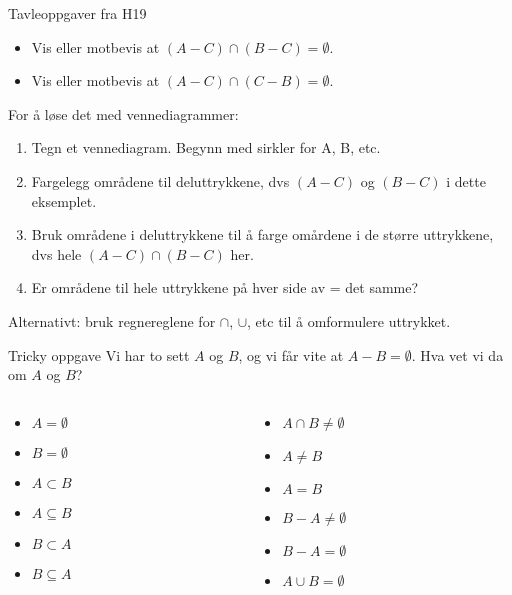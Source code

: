 \begin{frame}{Tavleoppgaver fra H19}
    \begin{itemize}
        \item Vis eller motbevis at $(A - C) \cap (B - C) = \emptyset.$
        \item Vis eller motbevis at $(A - C) \cap (C - B) = \emptyset.$
    \end{itemize}
    
    For å løse det med vennediagrammer:
    \begin{enumerate}
        \item Tegn et vennediagram. Begynn med sirkler for A, B, etc.
        \item Fargelegg områdene til deluttrykkene, dvs $(A - C)$ og $(B - C)$ i dette eksemplet.
        \item Bruk områdene i deluttrykkene til å farge omårdene i de større uttrykkene, dvs hele $(A - C) \cap (B - C)$ her.
        \item Er områdene til hele uttrykkene på hver side av = det samme?
    \end{enumerate}
    \pause
    Alternativt: bruk regnereglene for $\cap$, $\cup$, etc til å omformulere uttrykket.
\end{frame}

\begin{frame}{Tricky oppgave}
Vi har to sett $A$ og $B$, og vi får vite at $A - B = \emptyset$. Hva vet vi da om $A$ og $B$?\\[3mm]
    \begin{columns}
        \begin{column}{0.3\textwidth}
            \begin{itemize}
                \item $A = \emptyset$
                \item $B = \emptyset$
                \item $A \subset B$
                \item $A \subseteq B$
                \item $B \subset A$
                \item $B \subseteq A$
            \end{itemize}
        \end{column}
        \begin{column}{0.3\textwidth}
            \begin{itemize}
                \item $A \cap B \neq \emptyset$
                \item $A \neq B$
                \item $A = B$
                \item $B - A \neq \emptyset$
                \item $B - A = \emptyset$
                \item $A \cup B = \emptyset$
            \end{itemize}
        \end{column}
    \end{columns}
    
\end{frame}

